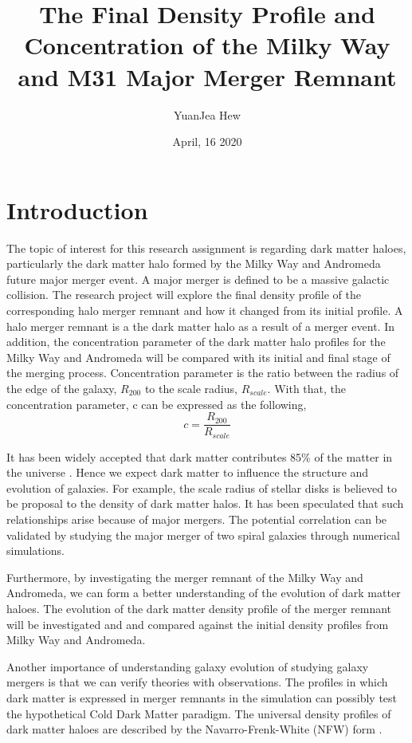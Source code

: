 \documentclass[twocolumn]{aastex63}
\begin{document}
\title{The Final Density Profile and Concentration of the Milky Way and M31 Major Merger Remnant}
\author{YuanJea Hew}
\date{April, 16 2020}


\section{Introduction}
\label{sec:intro}
The topic of interest for this research assignment is regarding dark matter haloes, particularly the dark matter halo formed by the Milky Way and Andromeda future major merger event. A major merger is defined to be a massive galactic collision. The research project will explore the final density profile of the corresponding halo merger remnant and how it changed from its initial profile. A halo merger remnant is a the dark matter halo as a result of a merger event. In addition, the concentration parameter of the dark matter halo profiles for the Milky Way and Andromeda will be compared with its initial and final stage of the merging process. Concentration parameter is the ratio between the radius of the edge of the galaxy, $R_{200}$ to the scale radius, $R_{scale}$. With that, the concentration parameter, c can be expressed as the following,
\[ c = \frac{R_{200}}{R_{scale}} \]\par
It has been widely accepted that dark matter contributes 85\% of the matter in the universe \cite{Planck}. Hence we expect dark matter to influence the structure and evolution of galaxies. For example, the scale radius of stellar disks is believed to be proposal to the density of dark matter halos. It has been speculated that such relationships arise because of major mergers\citep{d19b}. The potential correlation can be validated by studying the major merger of two spiral galaxies through numerical simulations.\par 
Furthermore, by investigating the merger remnant of the Milky Way and Andromeda, we can form a better understanding of the evolution of dark matter haloes. The evolution of the dark matter density profile of the merger remnant will be investigated and and compared against the initial density profiles from Milky Way and Andromeda.\par 
Another importance of understanding galaxy evolution of studying galaxy mergers is that we can verify theories with observations. The profiles in which dark matter is expressed in merger remnants in the simulation can possibly test the hypothetical Cold Dark Matter paradigm. The universal density profiles of dark matter haloes are described by the Navarro-Frenk-White (NFW) form \citep{d19b}.
\end{document}
